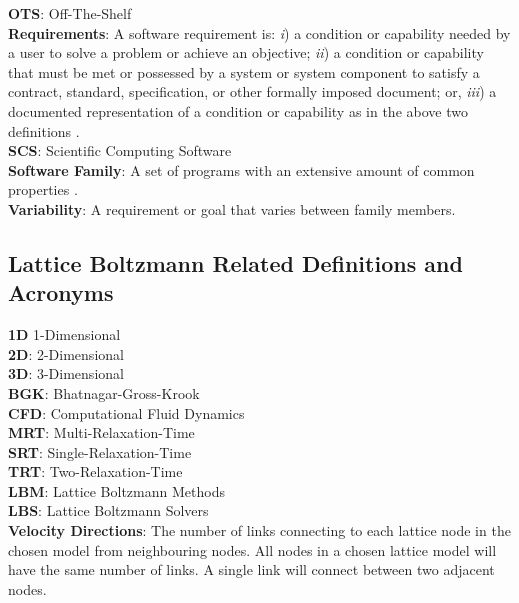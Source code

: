 \documentclass[12pt, notitlepage]{article}
\begin{document}
\begin{singlespace}
\noindent\textbf{OTS}: Off-The-Shelf\\

\noindent\textbf{Requirements}: A software requirement is: \textit{i}) a condition or capability needed by a user to solve a problem or achieve an objective; \textit{ii}) a condition or capability that must be met or possessed by a system or system component to satisfy a contract, standard, specification, or other formally imposed document; or, \textit{iii}) a documented representation of a condition or capability as in the above two definitions \citep{thayer2000ieee}.\\

\noindent\textbf{SCS}: Scientific Computing Software\\

\noindent\textbf{Software Family}: A set of programs with an extensive amount of common properties \cite{parnas1976design}.\\

\noindent\textbf{Variability}: A requirement or goal that varies between family members.

\newpage
\subsection*{Lattice Boltzmann Related Definitions and Acronyms}

\noindent\textbf{1D} 1-Dimensional\\

\noindent\textbf{2D}: 2-Dimensional\\

\noindent\textbf{3D}: 3-Dimensional\\

\noindent\textbf{BGK}: Bhatnagar-Gross-Krook \citep{bhatnagar1954model}\\

\noindent\textbf{CFD}: Computational Fluid Dynamics\\

\noindent\textbf{MRT}: Multi-Relaxation-Time\\

\noindent\textbf{SRT}: Single-Relaxation-Time\\

\noindent\textbf{TRT}: Two-Relaxation-Time\\

\noindent\textbf{LBM}: Lattice Boltzmann Methods\\

\noindent\textbf{LBS}: Lattice Boltzmann Solvers\\

\noindent\textbf{Velocity Directions}: The number of links connecting to each lattice node in the chosen model from neighbouring nodes. All nodes in a chosen lattice model will have the same number of links. A single link will connect between two adjacent nodes.


\end{singlespace}
\newpage
{}
\end{document}
